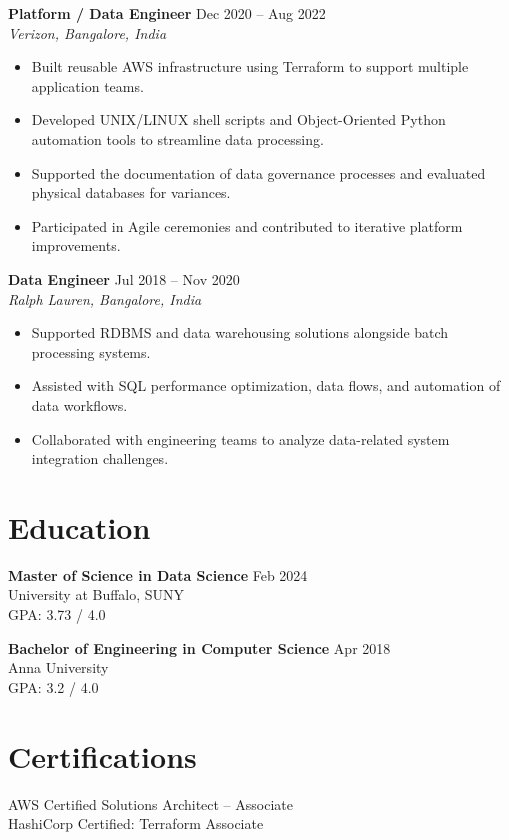 \documentclass[10pt]{article} %
\begin{document}
\textbf{Platform / Data Engineer} \hfill Dec 2020 -- Aug 2022 \\
\textit{Verizon, Bangalore, India}
\begin{itemize}[leftmargin=*, itemsep=3pt]
    \item Built reusable AWS infrastructure using Terraform to support multiple application teams. %
    \item Developed UNIX/LINUX shell scripts and Object-Oriented Python automation tools to streamline data processing. %
    \item Supported the documentation of data governance processes and evaluated physical databases for variances. %
    \item Participated in Agile ceremonies and contributed to iterative platform improvements. %
\end{itemize}

\textbf{Data Engineer} \hfill Jul 2018 -- Nov 2020 \\
\textit{Ralph Lauren, Bangalore, India}
\begin{itemize}[leftmargin=*, itemsep=3pt]
    \item Supported RDBMS and data warehousing solutions alongside batch processing systems. %
    \item Assisted with SQL performance optimization, data flows, and automation of data workflows. %
    \item Collaborated with engineering teams to analyze data-related system integration challenges. %
\end{itemize}

\section*{Education}

\textbf{Master of Science in Data Science} \hfill Feb 2024 \\
University at Buffalo, SUNY \\
GPA: 3.73 / 4.0

\textbf{Bachelor of Engineering in Computer Science} \hfill Apr 2018 \\
Anna University \\
GPA: 3.2 / 4.0

\section*{Certifications}
AWS Certified Solutions Architect – Associate \\
HashiCorp Certified: Terraform Associate
\end{document}
